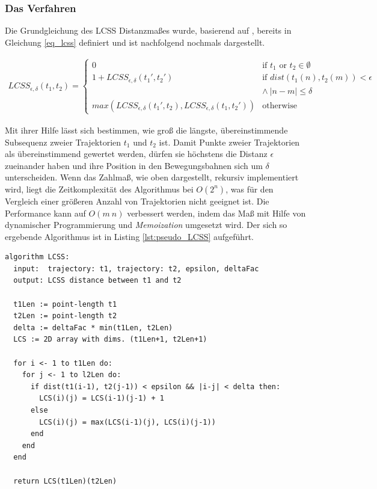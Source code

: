 \subsubsection{Das Verfahren}

Die Grundgleichung des LCSS Distanzmaßes wurde, basierend auf \cite[]{Vlachos2002}, bereits in Gleichung
\ref{eq_lcss} definiert und ist nachfolgend nochmals dargestellt.

\begin{ceqn}
\begin{align*}
\label{eq_lcss}
    LCSS_{\epsilon, \delta}(t_1, t_2) =
    \begin{cases}
        0 & \text{if } t_1 \text{ or } t_2 \in \emptyset \\
        1 + LCSS_{\epsilon, \delta}(t_1', t_2') & \text{if } dist(t_1(n), t_2(m)) < \epsilon \\
        & \land\ |n - m| \leq \delta \\
        max(LCSS_{\epsilon, \delta}(t_1', t_2), LCSS_{\epsilon, \delta}(t_1, t_2')) & \text{otherwise}
    \end{cases}
\end{align*}
\end{ceqn}

Mit ihrer Hilfe lässt sich bestimmen, wie groß die längste, übereinstimmende Subsequenz zweier Trajektorien
$t_1$ und $t_2$ ist. Damit Punkte zweier Trajektorien als übereinstimmend gewertet werden, dürfen sie
höchstens die Distanz $\epsilon$ zueinander haben und ihre Position in den Bewegungsbahnen sich um $\delta$
unterscheiden.
Wenn das Zahlmaß, wie oben dargestellt, rekursiv implementiert wird, liegt die Zeitkomplexität des Algorithmus
bei $O(2^n)$, was für den Vergleich einer größeren Anzahl von Trajektorien nicht geeignet ist. Die Performance
kann auf $O(m\ n)$ verbessert werden, indem das Maß mit Hilfe von dynamischer Programmierung und \textit{Memoization}
umgesetzt wird. Der sich so ergebende Algorithmus ist in Listing \ref{lst:pseudo_LCSS} aufgeführt.
\begin{lstlisting}[caption=Pseudocode LCSS Bestimmung, language=Pseudo, label=lst:pseudo_LCSS]
algorithm LCSS:
  input:  trajectory: t1, trajectory: t2, epsilon, deltaFac
  output: LCSS distance between t1 and t2

  t1Len := point-length t1
  t2Len := point-length t2
  delta := deltaFac * min(t1Len, t2Len)
  LCS := 2D array with dims. (t1Len+1, t2Len+1)

  for i <- 1 to t1Len do:
    for j <- 1 to l2Len do:
      if dist(t1(i-1), t2(j-1)) < epsilon && |i-j| < delta then:
        LCS(i)(j) = LCS(i-1)(j-1) + 1
      else
        LCS(i)(j) = max(LCS(i-1)(j), LCS(i)(j-1))
      end
    end
  end

  return LCS(t1Len)(t2Len)
\end{lstlisting}

